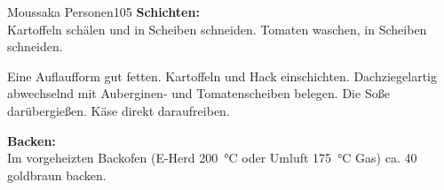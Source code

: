 \begin{MyRecipe}{Moussaka}{ Personen}{\SI{105}{\minuteprime}}
\textbf{Schichten:}\\
Kartoffeln schälen und in Scheiben schneiden. Tomaten waschen, in Scheiben schneiden. \par
Eine Auflaufform gut fetten. Kartoffeln und Hack einschichten. Dachziegelartig abwechselnd mit Auberginen- und Tomatenscheiben belegen. Die Soße darübergießen. Käse direkt daraufreiben. \par\bigskip

\textbf{Backen:}\\
Im vorgeheizten Backofen (E-Herd \SI{200}{\degreeCelsius} oder Umluft \SI{175}{\degreeCelsius} Gas) ca. \SI{40}{\minuteprime} goldbraun backen.
		
\end{MyRecipe}